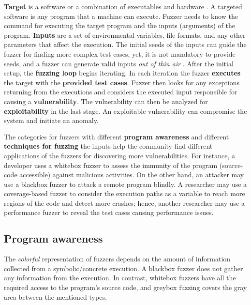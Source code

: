 \textbf{Target} is a software or a combination of executables and hardware \cite{song2019periscope}. A targeted software is any program that a machine can execute. 
Fuzzer needs to know the command for executing the target program and the inputs (arguments) of the program. \textbf{Inputs} are a set of environmental variables, file formats, and any other parameters that affect the execution. The initial seeds of the inputs can guide the fuzzer for finding more complex test cases, yet, it is not mandatory to provide seeds, and a fuzzer can generate valid inputs \textit{out of thin air} \cite{out_of_thin_air}. After the initial setup, the \textbf{fuzzing loop} begins iterating. In each iteration the fuzzer \textbf{executes} the target with the \textbf{provided test cases}. Fuzzer then looks for any exceptions returning from the executions and considers the executed input responsible for causing a \textbf{vulnerability}. The vulnerability can then be analyzed for \textbf{exploitability} in the last stage. An exploitable vulnerability can compromise the system and initiate an anomaly.

The categories for fuzzers with different \textbf{program awareness} and different \textbf{techniques for fuzzing} the inputs help the community find different applications of the fuzzers for discovering more vulnerabilities. For instance, a developer uses a whitebox fuzzer to assess the immunity of the program (source-code accessible) against malicious activities. On the other hand, an attacker may use a blackbox fuzzer to attack a remote program blindly. A researcher may use a coverage-based fuzzer to consider the execution paths as a variable to reach more regions of the code and detect more crashes; hence, another researcher may use a performance fuzzer to reveal the test cases causing performance issues. 

\subsection{Program awareness}


The \textit{colorful} representation of fuzzers depends on the amount of information collected from a symbolic/concrete execution. A blackbox fuzzer does not gather any information from the execution. In contrast, whitebox fuzzers have all the required access to the program's source code, and greybox fuzzing covers the gray area between the mentioned types.

